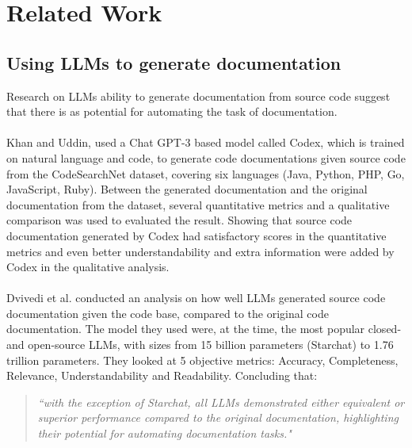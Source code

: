 \section{Related Work}
\subsection{Using LLMs to generate documentation}
\label{sec:related work LLM}
Research on LLMs ability to generate documentation from source code suggest that there is as potential for automating the task of documentation.
\\ \\
Khan and Uddin, \cite{10.1145/3551349.3559548} used a Chat GPT-3 based model called Codex, which is trained on natural language and code, to generate code documentations given source code from the CodeSearchNet dataset, covering six languages (Java, Python, PHP, Go, JavaScript, Ruby). Between the generated documentation and the original documentation from the dataset, several quantitative metrics and a qualitative comparison was used to evaluated the result. Showing that source code documentation generated by Codex had satisfactory scores in the quantitative metrics and even better understandability and extra information were added by Codex in the qualitative analysis.
\\ \\
Dvivedi et al. \cite{dvivedi2024comparativeanalysislargelanguage} conducted an analysis on how well LLMs generated source code documentation given the code base, compared to the original code documentation. The model they used were, at the time, the most popular closed- and open-source LLMs, with sizes from 15 billion parameters (Starchat) to 1.76 trillion parameters. They looked at 5 objective metrics: Accuracy, Completeness, Relevance, Understandability and Readability. Concluding that:
\begin{quote}
    \textit{``with the exception of Starchat, all LLMs demonstrated either equivalent or superior performance compared to the original documentation, highlighting their potential for automating documentation tasks."}
\end{quote}

